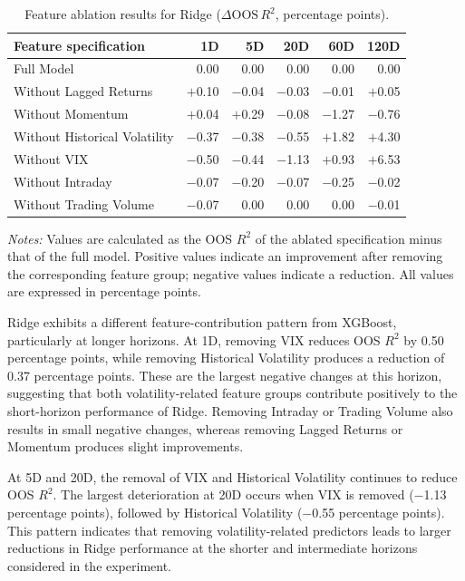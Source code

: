 \documentclass[runningheads,orivec]{llncs}
\begin{document}
\begin{table}[htbp]
\centering
\caption{Feature ablation results for Ridge ($\Delta \mathrm{OOS}\,R^2$, percentage points).}\label{tab:ablation_ridge}
{\footnotesize
\setlength{\tabcolsep}{6pt}
\begin{tabular}{lrrrrr}
\hline
Feature specification & 1D & 5D & 20D & 60D & 120D \\
\hline
Full Model & 0.00 & 0.00 & 0.00 & 0.00 & 0.00 \\
Without Lagged Returns & $+$0.10 & $-$0.04 & $-$0.03 & $-$0.01 & $+$0.05 \\
Without Momentum & $+$0.04 & $+$0.29 & $-$0.08 & $-$1.27 & $-$0.76 \\
Without Historical Volatility & $-$0.37 & $-$0.38 & $-$0.55 & $+$1.82 & $+$4.30 \\
Without VIX & $-$0.50 & $-$0.44 & $-$1.13 & $+$0.93 & $+$6.53 \\
Without Intraday & $-$0.07 & $-$0.20 & $-$0.07 & $-$0.25 & $-$0.02 \\
Without Trading Volume & $-$0.07 & 0.00 & 0.00 & 0.00 & $-$0.01 \\
\hline
\end{tabular}
}
\par\vspace{4pt}\parbox{\linewidth}{\scriptsize\textit{Notes:} Values are calculated as the OOS $R^2$ of the ablated specification minus that of the full model. Positive values indicate an improvement after removing the corresponding feature group; negative values indicate a reduction. All values are expressed in percentage points.}
\end{table}

Ridge exhibits a different feature-contribution pattern from XGBoost, particularly at longer horizons. At 1D, removing VIX reduces OOS $R^2$ by 0.50 percentage points, while removing Historical Volatility produces a reduction of 0.37 percentage points. These are the largest negative changes at this horizon, suggesting that both volatility-related feature groups contribute positively to the short-horizon performance of Ridge. Removing Intraday or Trading Volume also results in small negative changes, whereas removing Lagged Returns or Momentum produces slight improvements.

At 5D and 20D, the removal of VIX and Historical Volatility continues to reduce OOS $R^2$. The largest deterioration at 20D occurs when VIX is removed ($-$1.13 percentage points), followed by Historical Volatility ($-$0.55 percentage points). This pattern indicates that removing volatility-related predictors leads to larger reductions in Ridge performance at the shorter and intermediate horizons considered in the experiment.
\end{document}
